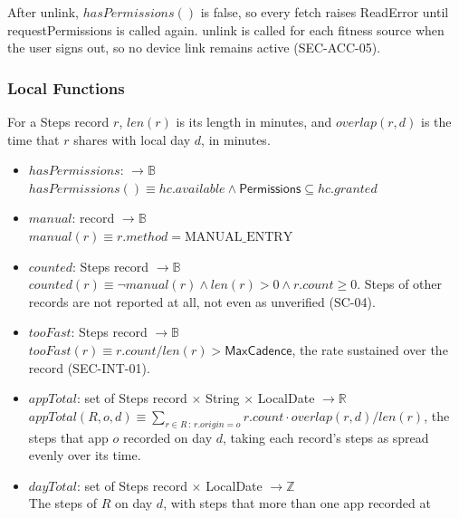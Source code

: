 \documentclass[12pt, titlepage]{article}
\begin{document}
\noindent After unlink, $\mathit{hasPermissions}()$ is false, so every fetch
raises ReadError until requestPermissions is called again. unlink is called
for each fitness source when the user signs out, so no device link remains
active (SEC-ACC-05).

\subsubsection{Local Functions}

\noindent For a Steps record $r$, $\mathit{len}(r)$ is its length in minutes,
and $\mathit{overlap}(r, d)$ is the time that $r$ shares with local day $d$,
in minutes.

\begin{itemize}
\item $\mathit{hasPermissions}$: $\rightarrow \mathbb{B}$\\
  $\mathit{hasPermissions}() \equiv \mathit{hc}.\mathit{available} \land
  \textsf{Permissions} \subseteq \mathit{hc}.\mathit{granted}$
\item $\mathit{manual}$: record $\rightarrow \mathbb{B}$\\
  $\mathit{manual}(r) \equiv r.\mathit{method} = \mathrm{MANUAL\_ENTRY}$
\item $\mathit{counted}$: Steps record $\rightarrow \mathbb{B}$\\
  $\mathit{counted}(r) \equiv \lnot \mathit{manual}(r) \land \mathit{len}(r)
  > 0 \land r.\mathit{count} \geq 0$. Steps of other records are not
  reported at all, not even as unverified (SC-04).
\item $\mathit{tooFast}$: Steps record $\rightarrow \mathbb{B}$\\
  $\mathit{tooFast}(r) \equiv r.\mathit{count} / \mathit{len}(r) >
  \textsf{MaxCadence}$, the rate sustained over the record (SEC-INT-01).
\item $\mathit{appTotal}$: set of Steps record $\times$ String $\times$
  LocalDate $\rightarrow \mathbb{R}$\\
  $\mathit{appTotal}(R, o, d) \equiv \sum_{r \in R \,:\, r.\mathit{origin} =
  o} r.\mathit{count} \cdot \mathit{overlap}(r, d) / \mathit{len}(r)$, the
  steps that app $o$ recorded on day $d$, taking each record's steps as
  spread evenly over its time.
\item $\mathit{dayTotal}$: set of Steps record $\times$ LocalDate
  $\rightarrow \mathbb{Z}$\\
  The steps of $R$ on day $d$, with steps that more than one app recorded at

\end{itemize}
\end{document}
